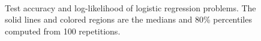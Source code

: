 \begin{figure}
{  } \\
  \caption{Test accuracy and log-likelihood of logistic regression problems.
    The solid lines and colored regions are the medians and 80\% percentiles computed from 100 repetitions.
  }\label{fig:logistic}
  \vspace{-0.2in}
\end{figure}

